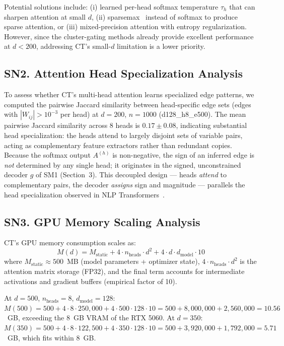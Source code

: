 \documentclass[12pt,a4paper]{article}
\begin{document}
Potential solutions include: (i) learned per-head softmax temperature $\tau_h$ that can sharpen attention at small $d$, (ii) sparsemax~\cite{martins2016softmax} instead of softmax to produce sparse attention, or (iii) mixed-precision attention with entropy regularization. However, since the cluster-gating methods already provide excellent performance at $d < 200$, addressing CT's small-$d$ limitation is a lower priority.

\subsection*{SN2. Attention Head Specialization Analysis}

To assess whether CT's multi-head attention learns specialized edge patterns, we computed the pairwise Jaccard similarity between head-specific edge sets (edges with $|W_{ij}| > 10^{-3}$ per head) at $d=200$, $n=1000$ (d128\_h8\_e500). The mean pairwise Jaccard similarity across 8 heads is $0.17 \pm 0.08$, indicating substantial head specialization: the heads attend to largely disjoint sets of variable pairs, acting as complementary feature extractors rather than redundant copies. Because the softmax output $A^{(h)}$ is non-negative, the sign of an inferred edge is \emph{not} determined by any single head; it originates in the signed, unconstrained decoder $g$ of SM1 (Section~3). This decoupled design --- heads \emph{attend} to complementary pairs, the decoder \emph{assigns} sign and magnitude --- parallels the head specialization observed in NLP Transformers~\cite{clark2019does}.

\subsection*{SN3. GPU Memory Scaling Analysis}

CT's GPU memory consumption scales as:
\[
M(d) = M_{\text{static}} + 4 \cdot n_{\text{heads}} \cdot d^2 + 4 \cdot d \cdot d_{\text{model}} \cdot 10
\]
where $M_{\text{static}} \approx 500$~MB (model parameters + optimizer state), $4 \cdot n_{\text{heads}} \cdot d^2$ is the attention matrix storage (FP32), and the final term accounts for intermediate activations and gradient buffers (empirical factor of 10).

At $d=500$, $n_{\text{heads}}=8$, $d_{\text{model}}=128$: $M(500) = 500 + 4 \cdot 8 \cdot 250{,}000 + 4 \cdot 500 \cdot 128 \cdot 10 = 500 + 8{,}000{,}000 + 2{,}560{,}000 = 10.56$~GB, exceeding the 8~GB VRAM of the RTX 5060. At $d=350$: $M(350) = 500 + 4 \cdot 8 \cdot 122{,}500 + 4 \cdot 350 \cdot 128 \cdot 10 = 500 + 3{,}920{,}000 + 1{,}792{,}000 = 5.71$~GB, which fits within 8~GB.
\end{document}
